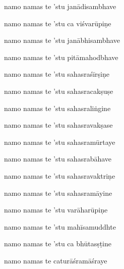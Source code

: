 \ujvers\nemsloka 
namo namas te 'stu janādisambhave
\dontdisplaylinenum
            \var{\vo \om\ \msCb}%

\nemslokab 
namo namas te 'stu ca viśvarūpiṇe \danda\dontdisplaylinenum

\nemslokac 
namo namas te 'stu janābhisambhave
\dontdisplaylinenum
            \var{\vc \om\ \msNa}%

\nemslokad 
namo namas te 'stu pitāmahodbhave \veg\dontdisplaylinenum

\ujvers\nemsloka 
namo namas te 'stu sahasraśīrṣiṇe
\dontdisplaylinenum
            \var{\va \om\ \msCb}%

\nemslokab 
namo namas te 'stu sahasracakṣuṣe \danda\dontdisplaylinenum
            \var{\vb \om\ \msCb}%

\nemslokac 
namo namas te 'stu sahasraliṅgine
\dontdisplaylinenum
            \var{\vc \om\ \msCb}%

\nemslokad 
namo namas te 'stu sahasravakṣase \veg\dontdisplaylinenum
            \var{\vo \om\ \msCa}%

\ujvers\nemsloka 
namo namas te 'stu sahasramūrtaye
\dontdisplaylinenum

\nemslokab 
namo namas te 'stu sahasrabāhave \danda\dontdisplaylinenum

\nemslokac 
namo namas te 'stu sahasravaktriṇe
\dontdisplaylinenum

\nemslokad 
namo namas te 'stu sahasramāyine \veg\dontdisplaylinenum
            \var{\vo \om\ \msCa}%

\ujvers\nemsloka 
namo namas te 'stu varāharūpiṇe
\dontdisplaylinenum
            \var{\va \om\ \msCa}%

\nemslokab 
namo namas te 'stu mahīsamuddhte \danda\dontdisplaylinenum

\nemslokac 
namo namas te 'stu ca bhūtasṣṭine
\dontdisplaylinenum

\nemslokad 
namo namas te caturāśramāśraye \veg\dontdisplaylinenum

